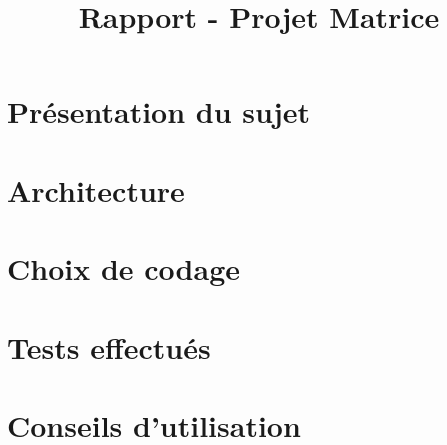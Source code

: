 
\title{Rapport - Projet Matrice}
\fancyhf{}
\lhead{\leftmark}


	\maketitle
	\tableofcontents
	\chapter{Présentation du sujet}
	
	
	\chapter{Architecture}
		
	
	\chapter{Choix de codage}
	
	
	\chapter{Tests effectués}
	
	
	\chapter{Conseils d'utilisation}


